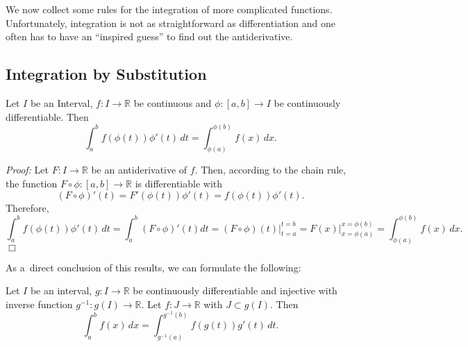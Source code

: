 

We now collect some rules for the integration of more complicated functions. Unfortunately, integration is not as straightforward as differentiation and one often has to have an ``inspired guess'' to find out the antiderivative.
\subsection{Integration by Substitution}

\begin{Theorem}
Let $I$ be an Interval, $f:I\to\mathbb{R}$ be continuous and $\phi:[a,b]\to I$ be continuously differentiable. Then
\[\int_a^bf(\phi(t))\phi'(t)\,dt=\int_{\phi(a)}^{\phi(b)}f(x)\, dx.\]
\end{Theorem}
{\em Proof:} Let $F: I\to\mathbb{R}$ be an antiderivative of $f$. Then, according to the chain rule, the function $F\circ\phi:[a,b]\to\mathbb{R}$ is differentiable with
\[(F\circ\phi)'(t)=F'(\phi(t))\phi'(t)=f(\phi(t))\phi'(t).\]
Therefore,
\[\int_a^bf(\phi(t))\phi'(t)\,dt=\int_a^b(F\circ\phi)'(t)dt=\left.(F\circ\phi)(t)\right|_{t=a}^{t=b}=\left.F(x)\right|_{x=\phi(a)}^{x=\phi(b)}=\int_{\phi(a)}^{\phi(b)}f(x)\, dx.\]
\hfill$\Box$

As a~direct conclusion of this results, we can formulate the following:
\begin{Theorem}
Let $I$ be an interval,
$g:I\to \mathbb{R}$ be continuously differentiable and injective with inverse function $g^{-1}:g(I)\to \mathbb{R}$. Let $f:J\to\mathbb{R}$ with $J\subset g(I)$. Then
\[\int_{a}^{b}f(x)\, dx=\int_{g^{-1}(a)}^{g^{-1}(b)}f(g(t))g'(t)\,dt.\]
\end{Theorem}


